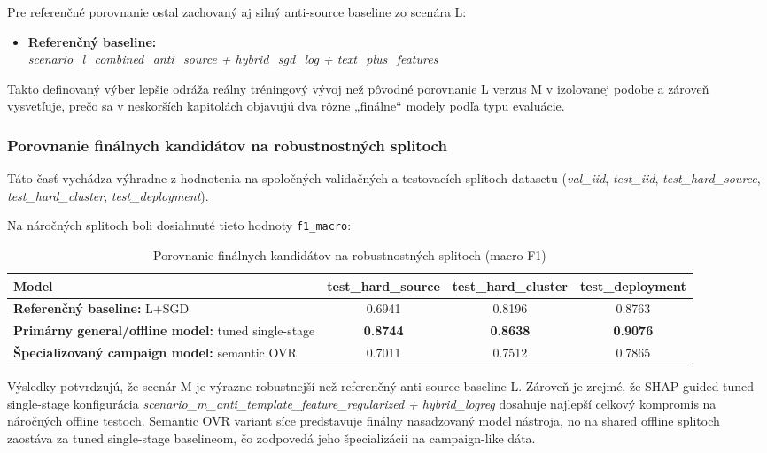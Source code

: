 \documentclass[conference]{IEEEtran}
\begin{document}
Pre referenčné porovnanie ostal zachovaný aj silný anti-source baseline zo scenára L:
\begin{itemize}
    \item \textbf{Referenčný baseline:} \\
    \textit{scenario\_l\_combined\_anti\_source + hybrid\_sgd\_log + text\_plus\_features}
\end{itemize}

Takto definovaný výber lepšie odráža reálny tréningový vývoj než pôvodné porovnanie L verzus M v izolovanej podobe a zároveň vysvetľuje, prečo sa v neskorších kapitolách objavujú dva rôzne „finálne“ modely podľa typu evaluácie.

\subsubsection{Porovnanie finálnych kandidátov na robustnostných splitoch}

Táto časť vychádza výhradne z hodnotenia na spoločných validačných a testovacích splitoch datasetu
(\textit{val\_iid}, \textit{test\_iid}, \textit{test\_hard\_source}, \textit{test\_hard\_cluster}, \textit{test\_deployment}).


Na náročných splitoch boli dosiahnuté tieto hodnoty \texttt{f1\_macro}:

\begin{table}[H]
\centering
\caption{Porovnanie finálnych kandidátov na robustnostných splitoch (macro F1)}
\label{tab:model_results}
\footnotesize
\setlength{\tabcolsep}{5pt}
\renewcommand{\arraystretch}{1.1}
\begin{tabular}{lccc}
\toprule
\textbf{Model} & \textbf{test\_hard\_source} & \textbf{test\_hard\_cluster} & \textbf{test\_deployment} \\
\midrule
\textbf{Referenčný baseline:} L+SGD & 0.6941 & 0.8196 & 0.8763 \\
\textbf{Primárny general/offline model:} tuned single-stage & \textbf{0.8744} & \textbf{0.8638} & \textbf{0.9076} \\
\textbf{Špecializovaný campaign model:} semantic OVR & 0.7011 & 0.7512 & 0.7865 \\
\bottomrule
\end{tabular}

\end{table}

Výsledky potvrdzujú, že scenár M je výrazne robustnejší než referenčný anti-source baseline L. Zároveň je zrejmé, že SHAP-guided tuned single-stage konfigurácia \textit{scenario\_m\_anti\_template\_feature\_regularized + hybrid\_logreg} dosahuje najlepší celkový kompromis na náročných offline testoch. Semantic OVR variant síce predstavuje finálny nasadzovaný model nástroja, no na shared offline splitoch zaostáva za tuned single-stage baselineom, čo zodpovedá jeho špecializácii na campaign-like dáta.
\end{document}
